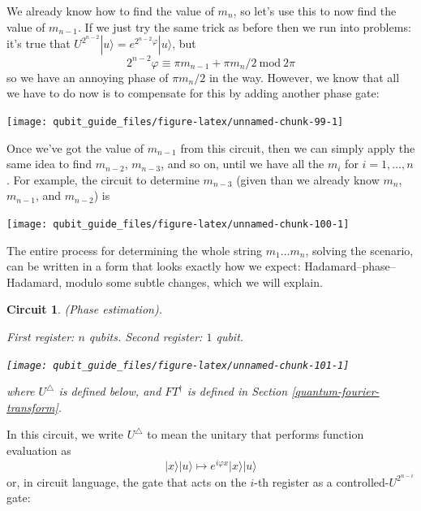 \documentclass[fleqn,a4paper]{article}
\newtheorem*{circuit}{Circuit}
\theoremstyle{definition}
\theoremstyle{definition}
\theoremstyle{definition}
\theoremstyle{definition}
\theoremstyle{remark}
\begin{document}
We already know how to find the value of \(m_n\), so let's use this to now find the value of \(m_{n-1}\).
If we just try the same trick as before then we run into problems: it's true that \(U^{2^{n-2}}|u\rangle=e^{2^{n-2}\varphi}|u\rangle\), but
\[
  2^{n-2}\varphi
  \equiv \pi m_{n-1}+\pi m_n/2 \ \mathrm{mod}\ 2\pi
\]
so we have an annoying phase of \(\pi m_n/2\) in the way.
However, we know that all we have to do now is to compensate for this by adding another phase gate:

\begin{center}\texttt{[image: qubit\_guide\_files/figure-latex/unnamed-chunk-99-1]} \end{center}

Once we've got the value of \(m_{n-1}\) from this circuit, then we can simply apply the same idea to find \(m_{n-2}\), \(m_{n-3}\), and so on, until we have all the \(m_i\) for \(i=1,\ldots,n\).
For example, the circuit to determine \(m_{n-3}\) (given than we already know \(m_n\), \(m_{n-1}\), and \(m_{n-2}\)) is

\begin{center}\texttt{[image: qubit\_guide\_files/figure-latex/unnamed-chunk-100-1]} \end{center}

The entire process for determining the whole string \(m_1\ldots m_n\), solving the scenario, can be written in a form that looks exactly how we expect: Hadamard--phase--Hadamard, modulo some subtle changes, which we will explain.

\begin{circuit}

\emph{(Phase estimation).}

First register: \(n\) qubits. Second register: \(1\) qubit.

\begin{center}\texttt{[image: qubit\_guide\_files/figure-latex/unnamed-chunk-101-1]} \end{center}

where \(U^\triangle\) is defined below, and \(FT^\dagger\) is defined in Section \ref{quantum-fourier-transform}.

\end{circuit}

In this circuit, we write \(U^\triangle\) to mean the unitary that performs function evaluation as
\[
  |x\rangle|u\rangle
  \longmapsto e^{i\varphi x}|x\rangle|u\rangle
\]
or, in circuit language, the gate that acts on the \(i\)-th register as a controlled-\(U^{2^{n-i}}\) gate:
\end{document}
